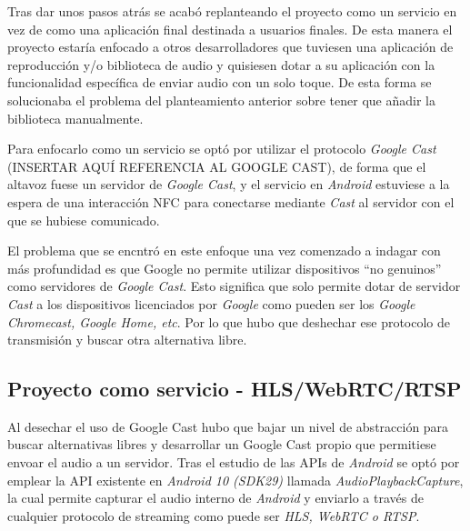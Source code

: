Tras dar unos pasos atrás se acabó replanteando el proyecto como un servicio en
vez de como una aplicación final destinada a usuarios finales. De esta manera el
proyecto estaría enfocado a otros desarrolladores que tuviesen una aplicación de
reproducción y/o biblioteca de audio y quisiesen dotar a su aplicación con la
funcionalidad específica de enviar audio con un solo toque. De esta forma se
solucionaba el problema del planteamiento anterior sobre tener que añadir la
biblioteca manualmente.

Para enfocarlo como un servicio se optó por utilizar el protocolo \emph{Google
Cast} (INSERTAR AQUÍ REFERENCIA AL GOOGLE CAST), de forma que el altavoz fuese
un servidor de \emph{Google Cast}, y el servicio en \emph{Android} estuviese a
la espera de una interacción NFC para conectarse mediante \emph{Cast} al
servidor con el que se hubiese comunicado.

El problema que se encntró en este enfoque una vez comenzado a indagar con más
profundidad es que Google no permite utilizar dispositivos ``no genuinos'' como
servidores de \emph{Google Cast}. Esto significa que solo permite dotar de
servidor \emph{Cast} a los dispositivos licenciados por \emph{Google} como
pueden ser los \emph{Google Chromecast, Google Home, etc}. Por lo que hubo que
deshechar ese protocolo de transmisión y buscar otra alternativa libre.

\subsection{Proyecto como servicio - HLS/WebRTC/RTSP}

Al desechar el uso de Google Cast hubo que bajar un nivel de abstracción para
buscar alternativas libres y desarrollar un Google Cast propio que permitiese
envoar el audio a un servidor. Tras el estudio de las APIs de \emph{Android} se
optó por emplear la API existente en \emph{Android 10 (SDK29)} llamada
\emph{AudioPlaybackCapture}, la cual permite capturar el audio interno de
\emph{Android} y enviarlo a través de cualquier protocolo de streaming como
puede ser \emph{HLS, WebRTC o RTSP}.  